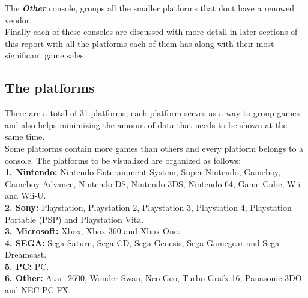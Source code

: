 The \textit{\textbf{Other}} console, groups all the smaller platforms that
dont have a renowed vendor.\\

Finally each of these consoles are discussed with more detail in later
sections of this report with all the platforms each of them has along with
their most significant game sales.


\subsection{The platforms}
There are a total of 31 platforms; each platform serves as a way to group
games and also helps minimizing the amount of data that needs to be shown
at the same time.\\

Some platforms contain more games than others and every platform belongs to a
console. The platforms to be visualized are organized as follows:\\
\textbf{1. Nintendo:} Nintendo Enterainment System, Super Nintendo, Gameboy,
Gameboy Advance, Nintendo DS, Nintendo 3DS, Nintendo 64, Game Cube, Wii and
Wii-U.\\
\textbf{2. Sony:} Playstation, Playstation 2, Playstation 3, Playstation 4,
Playstation Portable (PSP) and Playstation Vita.\\
\textbf{3. Microsoft:} Xbox, Xbox 360 and Xbox One.\\
\textbf{4. SEGA:} Sega Saturn, Sega CD, Sega Genesis, Sega Gamegear and Sega Dreamcast.\\
\textbf{5. PC:} PC.\\
\textbf{6. Other:} Atari 2600, Wonder Swan, Neo Geo, Turbo Grafx 16,
Panasonic 3DO and NEC PC-FX.

